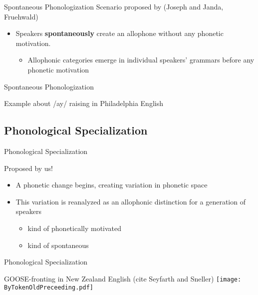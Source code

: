 \documentclass[hyperref={pdfpagelabels=false}]{beamer}
\begin{document}
\begin{frame}{Spontaneous Phonologization}
	Scenario proposed by (Joseph and Janda, Fruehwald) 
	
	\begin{itemize}
		\item Speakers \textbf{spontaneously} create an allophone without any phonetic motivation.  \\
		\begin{itemize}
			\item Allophonic categories emerge in individual speakers' grammars before any phonetic motivation
		\end{itemize}
	\end{itemize}

\end{frame}

\begin{frame}{Spontaneous Phonologization}

	Example about /ay/ raising in Philadelphia English

\end{frame}

\subsection{Phonological Specialization}

\begin{frame}{Phonological Specialization}

	Proposed by us!
	\begin{itemize}
		\item A phonetic change begins, creating variation in phonetic space
		\item This variation is reanalyzed as an allophonic distinction for a generation of speakers
		\begin{itemize}
				\item kind of phonetically motivated
				\item kind of spontaneous
		\end{itemize}
	\end{itemize}

\end{frame}

\begin{frame}{Phonological Specialization}

\begin{center}
GOOSE-fronting in New Zealand English (cite Seyfarth and Sneller) %
\texttt{[image: ByTokenOldPreceeding.pdf]}
\end{center}

\end{frame}
\end{document}
